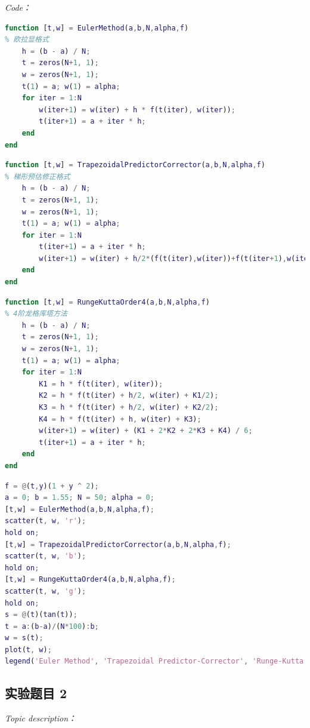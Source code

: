 \documentclass[12pt]{ctexart}
\begin{document}
	\textit{Code：}
	
\begin{lstlisting}[language = MATLAB]
function [t,w] = EulerMethod(a,b,N,alpha,f)
% 欧拉显格式
	h = (b - a) / N;
	t = zeros(N+1, 1);
	w = zeros(N+1, 1);
	t(1) = a; w(1) = alpha;
	for iter = 1:N
		w(iter+1) = w(iter) + h * f(t(iter), w(iter));
		t(iter+1) = a + iter * h;
	end
end
\end{lstlisting}

\begin{lstlisting}[language = MATLAB]
function [t,w] = TrapezoidalPredictorCorrector(a,b,N,alpha,f)
% 梯形预估修正格式
	h = (b - a) / N;
	t = zeros(N+1, 1);
	w = zeros(N+1, 1);
	t(1) = a; w(1) = alpha;
	for iter = 1:N
		t(iter+1) = a + iter * h;
		w(iter+1) = w(iter) + h/2*(f(t(iter),w(iter))+f(t(iter+1),w(iter)+h*f(t(iter),w(iter))));
	end
end
\end{lstlisting}

\begin{lstlisting}[language = MATLAB]
function [t,w] = RungeKuttaOrder4(a,b,N,alpha,f)
% 4阶龙格库塔方法
	h = (b - a) / N;
	t = zeros(N+1, 1);
	w = zeros(N+1, 1);
	t(1) = a; w(1) = alpha;
	for iter = 1:N
		K1 = h * f(t(iter), w(iter));
		K2 = h * f(t(iter) + h/2, w(iter) + K1/2);
		K3 = h * f(t(iter) + h/2, w(iter) + K2/2);
		K4 = h * f(t(iter) + h, w(iter) + K3);
		w(iter+1) = w(iter) + (K1 + 2*K2 + 2*K3 + K4) / 6;
		t(iter+1) = a + iter * h;
	end
end
\end{lstlisting}

\begin{lstlisting}[language = MATLAB]
% 第5章 第1题
f = @(t,y)(1 + y ^ 2);
a = 0; b = 1.55; N = 50; alpha = 0;
[t,w] = EulerMethod(a,b,N,alpha,f);
scatter(t, w, 'r');
hold on;
[t,w] = TrapezoidalPredictorCorrector(a,b,N,alpha,f);
scatter(t, w, 'b');
hold on;
[t,w] = RungeKuttaOrder4(a,b,N,alpha,f);
scatter(t, w, 'g');
hold on;
s = @(t)(tan(t));
t = a:(b-a)/(N*100):b;
w = s(t);
plot(t, w);
legend('Euler Method', 'Trapezoidal Predictor-Corrector', 'Runge-Kutta Order 4', 'y(x)', 'Location', 'northwest');
\end{lstlisting}
	
	\subsection{实验题目 2}
	\textit{Topic description：}
	
\end{document}
